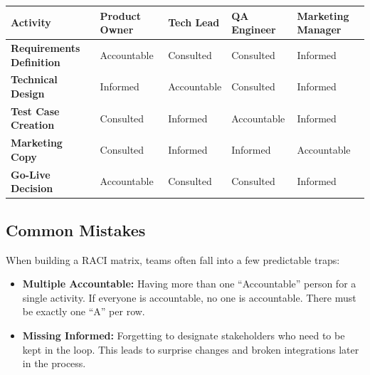 \begin{longtable}[]{@{}
  >{\raggedright\arraybackslash}p{}
  >{\raggedright\arraybackslash}p{}
  >{\raggedright\arraybackslash}p{}
  >{\raggedright\arraybackslash}p{}
  >{\raggedright\arraybackslash}p{}@{}}
\toprule\noalign{}
\begin{minipage}[b]{\linewidth}\raggedright
Activity
\end{minipage} & \begin{minipage}[b]{\linewidth}\raggedright
Product Owner
\end{minipage} & \begin{minipage}[b]{\linewidth}\raggedright
Tech Lead
\end{minipage} & \begin{minipage}[b]{\linewidth}\raggedright
QA Engineer
\end{minipage} & \begin{minipage}[b]{\linewidth}\raggedright
Marketing Manager
\end{minipage} \\
\midrule\noalign{}
\endhead
\bottomrule\noalign{}
\endlastfoot
\textbf{Requirements Definition} & Accountable & Consulted & Consulted &
Informed \\
\textbf{Technical Design} & Informed & Accountable & Consulted &
Informed \\
\textbf{Test Case Creation} & Consulted & Informed & Accountable &
Informed \\
\textbf{Marketing Copy} & Consulted & Informed & Informed &
Accountable \\
\textbf{Go-Live Decision} & Accountable & Consulted & Consulted &
Informed \\
\end{longtable}

\subsection{Common Mistakes}\label{common-mistakes}

When building a RACI matrix, teams often fall into a few predictable
traps:

\begin{itemize}
\tightlist
\item
  \textbf{Multiple Accountable:} Having more than one ``Accountable''
  person for a single activity. If everyone is accountable, no one is
  accountable. There must be exactly one ``A'' per row.
\item
  \textbf{Missing Informed:} Forgetting to designate stakeholders who
  need to be kept in the loop. This leads to surprise changes and broken
  integrations later in the process.
\end{itemize}

